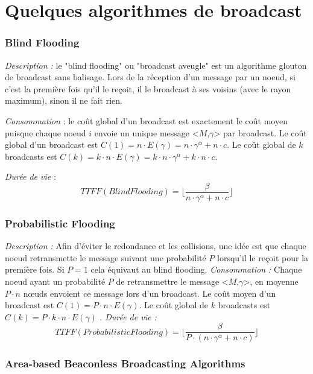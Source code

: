 \section{Quelques algorithmes de broadcast}

\subsubsection{Blind Flooding\label{blind_flooding}}


\emph{Description :} le "blind flooding" ou "broadcast aveugle" est un algorithme glouton de broadcast sans balisage. Lors de la réception d'un message par un noeud, si c'est la première fois qu'il le reçoit, il le broadcast à ses voisins (avec le rayon maximum), sinon il ne fait rien.

\emph{Consommation} :  le coût global d'un broadcast est exactement le coût moyen puisque chaque noeud $i$ envoie un unique message <$M$,$\gamma$> par broadcast.
Le coût global d'un broadcast est $C(1) = n \cdot E( \gamma )= n\cdot \gamma^\alpha +  n\cdot c $.
Le coût global de $k$ broadcasts est $C(k) = k\cdot n \cdot E( \gamma )= k\cdot n \cdot \gamma^\alpha +  k \cdot n\cdot c $.

\emph{Durée de vie} :   $$TTFF(Blind Flooding)=\lfloor \frac{\beta}{n\cdot \gamma^\alpha +  n\cdot c} \rfloor$$



\subsubsection{Probabilistic Flooding\label{proba_flooding}}

\emph{Description :} Afin d'éviter le redondance et les collisions, une idée est que chaque noeud retransmette le message suivant une probabilité $P$ lorsqu'il le reçoit pour la première fois. Si $P=1$ cela équivaut au blind flooding.
\emph{Consommation :} Chaque noeud ayant un probabilité $P$ de retransmettre le message <$M$,$\gamma$>, en moyenne $P\cdot n$ nœuds envoient ce message lors d'un broadcast.
Le coût moyen d'un broadcast est $C(1) = P\cdot n \cdot E( \gamma ) $. Le coût global de $k$ broadcasts est $C(k) = P\cdot k\cdot n \cdot E( \gamma ) $ .
\emph{Durée de vie :} $$TTFF(Probabilistic Flooding)=\lfloor \frac{\beta}{P \cdot (n\cdot \gamma^\alpha +  n\cdot c)} \rfloor$$


\subsubsection{Area-based Beaconless Broadcasting Algorithms \cite{Ovalle2006}}


